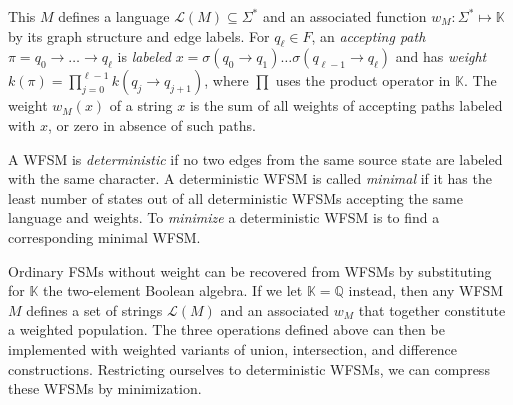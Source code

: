 \documentclass{llncs}
\begin{document}
This $M$ defines a language $\mathcal{L}(M) \subseteq \Sigma^*$ and an associated function $w_M : \Sigma^* \mapsto \mathbb{K}$ by its graph structure and edge labels.
For $q_\ell \in F$,
an \emph{accepting path} $\pi = q_0 \to \ldots \to q_\ell$ is
\emph{labeled} $x = \sigma(q_0 \to q_1) \ldots \sigma(q_{\ell-1} \to q_\ell)$
and has \emph{weight} $k(\pi)=\prod_{j=0}^{\ell-1} k( q_j \to q_{j+1} )$,
where $\prod$ uses the product operator in $\mathbb{K}$.
The weight $w_M(x)$ of a string $x$ is the sum of all weights of accepting paths labeled with $x$, or zero in absence of such paths.

A WFSM is \emph{deterministic} if no two edges from the same source
state are labeled with the same character.
A deterministic WFSM is called \emph{minimal} if it has the least
number of states out of all deterministic WFSMs accepting the same
language and weights.
To \emph{minimize} a deterministic WFSM is to find a corresponding minimal WFSM. %

Ordinary FSMs without weight can be recovered from WFSMs by
substituting for $\mathbb{K}$ the two-element Boolean algebra.
If we let $\mathbb{K}=\mathbb{Q}$ instead,
then any WFSM $M$ defines a set of strings $\mathcal{L}(M)$ and an
associated $w_M$ that together constitute a weighted population.
The three operations defined above can then be implemented with
weighted variants of union, intersection, and difference constructions.
Restricting ourselves to deterministic WFSMs,
we can compress these WFSMs by minimization.



\end{document}
